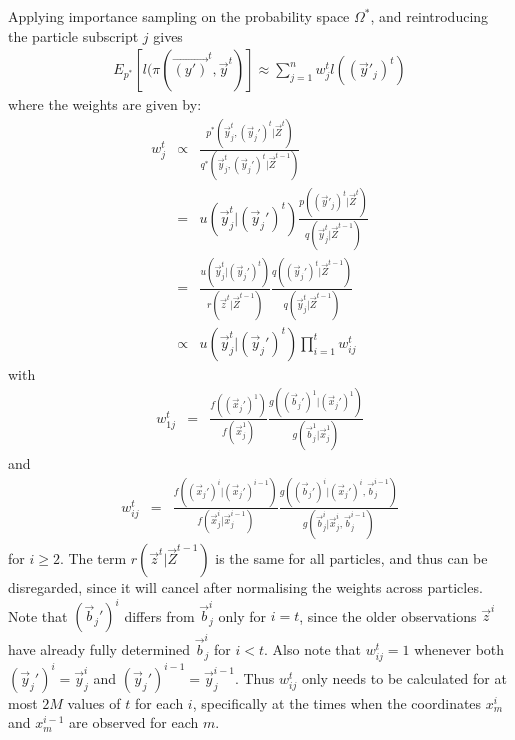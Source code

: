 Applying importance sampling on the probability space $\Omega^*$, and reintroducing the particle subscript $j$ gives
\begin{align*}
    E_{p^*}[l(\pi (\vec{(y')}^{t}, \vec{y}^{t})] 
    \approx \sum_{j=1}^n  w^{t}_j l((\vec{y}'_j)^{t})
\end{align*}
where the weights are given by:
\begin{eqnarray*}
    w^{t}_j &\propto& \frac{p^*(\vec{y}_j^{t}, (\vec{y}_j')^{t} | \vec{Z}^{t})} {q^*(\vec{y}_j^{t}, (\vec{y}_j')^{t} |\vec{Z}^{t-1})} \\
    &=& u(\vec{y}_j^{t} | (\vec{y}_j')^{t})\frac{p((\vec{y}'_j)^{t} | \vec{Z}^{t})}{q(\vec{y}_j^{t} | \vec{Z}^{t-1})} \\
    &=& \frac{u(\vec{y}_j^{t} | (\vec{y}_j')^{t})}{r(\vec{z}^{t} | \vec{Z}^{t-1})} \frac{q((\vec{y}_j')^{t} | \vec{Z}^{t-1})}{q(\vec{y}_j^{t} | \vec{Z}^{t-1})} \\
    & \propto & u(\vec{y}_j^{t} | (\vec{y}_j')^{t}) \prod_{i=1}^{t} w^{t}_{ij}
\end{eqnarray*}
with
\begin{eqnarray*}
w^{t}_{1j} &=& \frac{f((\vec{x}_j')^1)}{f(\vec{x}_j^1)} \frac{g((\vec{b}_j')^1 | (\vec{x}_j')^1)}{g(\vec{b}_j^1 | \vec{x}_j^1)}
\end{eqnarray*}
and
\begin{eqnarray*}
w^{t}_{ij} &=& \frac{f((\vec{x}_j')^i | (\vec{x}_j')^{i-1})}{f(\vec{x}_j^i | \vec{x}_j^{i-1})} \frac{g((\vec{b}_j')^i | (\vec{x}_j')^i, \vec{b}_j^{i-1})}{g(\vec{b}_j^i | \vec{x}_j^i, \vec{b}_j^{i-1})}
\end{eqnarray*}
for $i \geq 2$.
The term $r(\vec{z}^{t} | \vec{Z}^{t-1})$ is the same for all particles, and thus can be disregarded, since it will cancel after normalising the weights across particles. Note that $(\vec{b}_j')^i$ differs from $\vec{b}_j^i$ only for $i = t$, since the older observations $\vec{z}^{i}$ have already fully determined $\vec{b}_j^i$ for $i < t$. Also note that $w^{t}_{ij} = 1$ whenever both $(\vec{y}_j')^i = \vec{y}_j^i$ and $(\vec{y}_j')^{i-1} = \vec{y}_j^{i-1}$. Thus $w^{t}_{ij}$ only needs to be calculated for at most $2M$ values of $t$ for each $i$, specifically at the times when the coordinates $x^{i}_m$ and $x^{i-1}_m$ are observed for each $m$.

